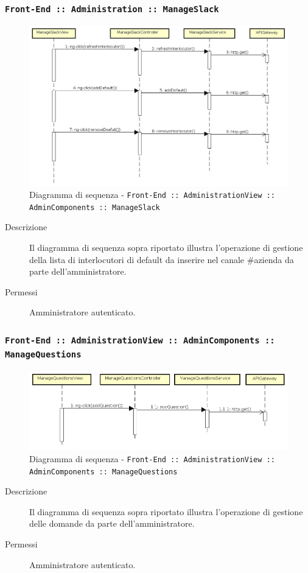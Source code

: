 \documentclass[../DefinizioneDiProdotto_v2.0.0.tex]{subfiles}
\begin{document}
\subsubsection{\texttt{Front-End :: Administration :: ManageSlack}}
\begin{figure}[!h]
	\centering
	\includegraphics[scale=0.3]{DiagrammiSequenza/Front-End/AdministrationView/ManageSlack.png}
	\caption{Diagramma di sequenza - \texttt{Front-End :: AdministrationView :: AdminComponents :: ManageSlack }}
\end{figure}
\begin{description}
	\item [Descrizione] Il diagramma di sequenza sopra riportato illustra l'operazione di gestione della lista di interlocutori di default da inserire nel canale \#azienda da parte dell'amministratore.
	\item [Permessi] Amministratore autenticato.
\end{description}

\subsubsection{\texttt{Front-End :: AdministrationView :: AdminComponents :: ManageQuestions}}
\begin{figure}[!h]
	\centering
	\includegraphics[scale=0.3]{DiagrammiSequenza/Front-End/AdministrationView/ManageQuestions.png}
	\caption{Diagramma di sequenza - \texttt{Front-End :: AdministrationView :: AdminComponents :: ManageQuestions }}
\end{figure}
\begin{description}
	\item [Descrizione] Il diagramma di sequenza sopra riportato illustra l'operazione di gestione delle domande da parte dell'amministratore.
	\item [Permessi] Amministratore autenticato.
\end{description}
\end{document}
